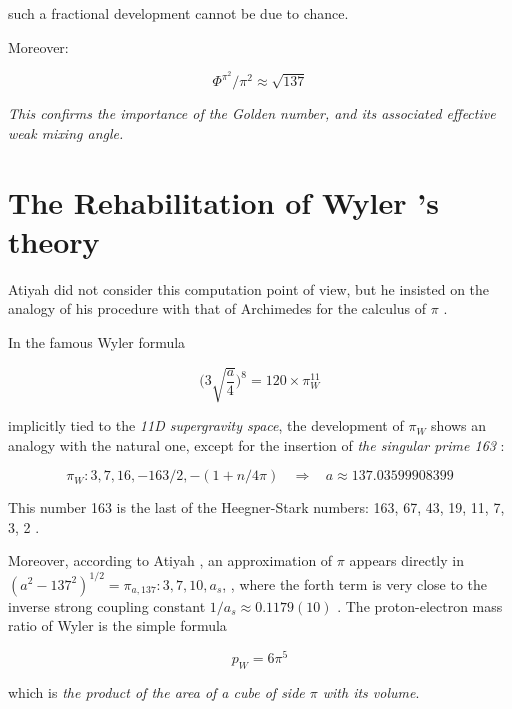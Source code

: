 \documentclass[a4paper,9pt]{article}
\begin{document}
such a fractional development cannot be due to chance. 


Moreover:

\begin{equation}
\Phi^{\pi^2}/\pi^2 \approx \sqrt{137}
\end{equation}


\textit{This confirms the importance of the Golden number, and its associated effective weak mixing angle.}






\section{The Rehabilitation of Wyler 's theory}

Atiyah did not consider this computation point of view, but he insisted on the analogy of his procedure with that of Archimedes for the calculus of $\pi$ \cite{Atiyah}.


In the famous Wyler formula \cite{Wyler} 

\begin{equation}
\bigg(3\sqrt{\frac{a}{4}} \bigg)^8 = 120 \times \pi_W^{11}
\end{equation}


implicitly tied to the \emph{11D supergravity space}, the development of  $\pi_W$ shows an analogy with the natural one, except for the insertion of \textit {the singular prime 163} :

\begin{equation}
\pi_W : 3, 7, 16,- 163/2, -(1+n/4\pi) ~~~~\Rightarrow ~~~~    a \approx 137.03599908399
\end{equation}


This number 163 is the last of the Heegner-Stark numbers: 163, 67, 43, 19, 11, 7, 3, 2 \cite{Stark}. 


Moreover, according to Atiyah \cite{Atiyah1}, an approximation of $\pi$ appears directly in $(a^2-137^2)^{1/2} = \pi_{a,137} : 3, 7, 10, a_s$, , where the forth term is very close to the inverse strong coupling constant $1/a_s \approx 0.1179(10)$ \cite{Tanabashi}. The proton-electron mass ratio of Wyler \cite{Wyler} is the simple formula 

\begin{equation}
 p_W = 6\pi^5    
\end{equation}

which is \textit {the product of the area of a cube of side $\pi$ with its volume}. 
\end{document}
